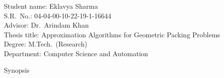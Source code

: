\documentclass[oneside,12pt,fleqn]{IIScthesisPSnPDF}
\begin{document}
\noindent Student name: Eklavya Sharma
\\\noindent S.R.~No.: 04-04-00-10-22-19-1-16644
\\\noindent Advisor: Dr.~Arindam Khan
\\\noindent Thesis title: Approximation Algorithms for Geometric Packing Problems
\\\noindent Degree: M.Tech.~(Research)
\\\noindent Department: Computer Science and Automation
\vspace{1cm}

{\Huge\bfseries\begin{center}Synopsis\end{center}}
\vspace{1cm}


\end{document}
